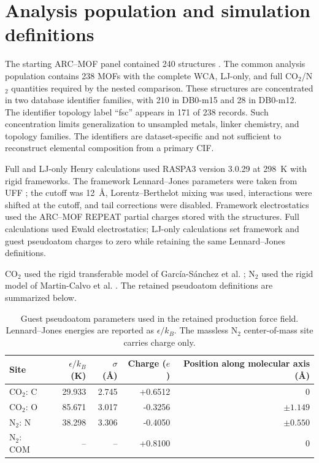 \documentclass[11pt,a4paper]{article}
\begin{document}
\section{Analysis population and simulation definitions}

The starting ARC--MOF panel contained 240 structures \cite{burner2023arcmof}. The common analysis population contains 238 MOFs with the complete WCA, LJ-only, and full CO$_2$/N$_2$ quantities required by the nested comparison. These structures are concentrated in two database identifier families, with 210 in DB0-m15 and 28 in DB0-m12. The identifier topology label ``fsc'' appears in 171 of 238 records. Such concentration limits generalization to unsampled metals, linker chemistry, and topology families. The identifiers are dataset-specific and not sufficient to reconstruct elemental composition from a primary CIF.

Full and LJ-only Henry calculations used RASPA3 version 3.0.29 \cite{ran2024raspa3,dubbeldam2016raspa} at 298~K with rigid frameworks. The framework Lennard--Jones parameters were taken from UFF \cite{rappe1992uff}; the cutoff was 12~\AA{}, Lorentz--Berthelot mixing was used, interactions were shifted at the cutoff, and tail corrections were disabled. Framework electrostatics used the ARC--MOF REPEAT partial charges stored with the structures. Full calculations used Ewald electrostatics; LJ-only calculations set framework and guest pseudoatom charges to zero while retaining the same Lennard--Jones definitions.

CO$_2$ used the rigid transferable model of Garc\'ia-S\'anchez et al. \cite{garciasanchez2009co2}; N$_2$ used the rigid model of Martin-Calvo et al. \cite{martincalvo2015gases}. The retained pseudoatom definitions are summarized below.

\begin{table}[H]
\centering
\caption{Guest pseudoatom parameters used in the retained production force field. Lennard--Jones energies are reported as $\epsilon/k_B$. The massless N$_2$ center-of-mass site carries charge only.}
\begin{tabular}{lrrrr}
\toprule
Site & $\epsilon/k_B$ (K) & $\sigma$ (\AA{}) & Charge ($e$) & Position along molecular axis (\AA{})\\
\midrule
CO$_2$: C & 29.933 & 2.745 & +0.6512 & 0\\
CO$_2$: O & 85.671 & 3.017 & -0.3256 & $\pm 1.149$\\
N$_2$: N & 38.298 & 3.306 & -0.4050 & $\pm 0.550$\\
N$_2$: COM & -- & -- & +0.8100 & 0\\
\bottomrule
\end{tabular}
\end{table}
\end{document}
